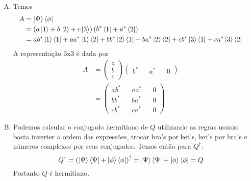 \documentclass[a4paper, 12pt, notitlepage]{article}
\begin{document}
\begin{enumerate}
\begin{enumerate}[(A)]
  \item Temos
  \begin{align*}
    A &= \ket{\Psi}\bra{\phi} \\
    &= \left(a\ket{1} + b\ket{2} + c\ket{3}\right)\left( b^\ast\bra{1} + a^\ast\bra{2} \right) \\
    &= ab^\ast \ket{1}\bra{1} + aa^\ast\ket{1}\bra{2} + bb^\ast \ket{2}\bra{1} + ba^\ast \ket{2}\bra{2} + cb^\ast \ket{3}\bra{1} + ca^\ast \ket{3}\bra{2}
  \end{align*}
  A representação 3x3 é dada por
  \begin{align*}
  A &= \begin{pmatrix} a \\ b \\ c \end{pmatrix} \begin{pmatrix} b^\ast && a^\ast && 0 \end{pmatrix} \\
  &= \begin{pmatrix}
    ab^\ast && aa^\ast && 0 \\
    bb^\ast && ba^\ast && 0 \\
    cb^\ast && ca^\ast && 0
  \end{pmatrix}
  \end{align*}
  
  \item Podemos calcular o conjugado hermitiano de $Q$ utilizando as regras usuais: basta inverter a ordem das expressões, trocar bra's por ket's, ket's por bra's e números complexos por seus conjugados. Temos então para $Q^{\dagger}$:
  \[
  Q^{\dagger} = \left(\ket{\Psi}\bra{\Psi} + \ket{\phi}\bra{\phi}\right)^{\dagger} = \ket{\Psi}\bra{\Psi} + \ket{\phi}\bra{\phi} = Q
  \]
  Portanto $Q$ é hermitiano.
  

\end{enumerate}
\end{enumerate}
\end{document}
